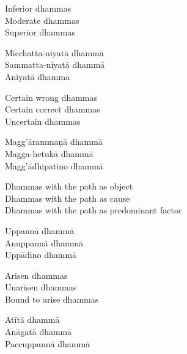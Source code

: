 \begin{english-verses}
  Inferior dhammas\\
  Moderate dhammas\\
  Superior dhammas
\end{english-verses}

\begin{pali-hang-continued}
  Micchatta-niyatā dhammā\\
  Sammatta-niyatā dhammā\\
  Aniyatā dhammā
\end{pali-hang-continued}

\begin{english-verses}
  Certain wrong dhammas\\
  Certain correct dhammas\\
  Uncertain dhammas
\end{english-verses}

\ifbfive\clearpage\fi

\begin{pali-hang-continued}
  Magg'ārammaṇā dhammā\\
  Magga-hetukā dhammā\\
  Magg'ādhipatino dhammā
\end{pali-hang-continued}

\ifafive\clearpage\fi

\begin{english-verses}
  Dhammas with the path as object\\
  Dhammas with the path as cause\\
  Dhammas with the path as predominant factor
\end{english-verses}

\begin{pali-hang-continued}
  Uppannā dhammā\\
  Anuppannā dhammā\\
  Uppādino dhammā
\end{pali-hang-continued}

\begin{english-verses}
  Arisen dhammas\\
  Unarisen dhammas\\
  Bound to arise dhammas
\end{english-verses}

\begin{pali-hang-continued}
  Atītā dhammā\\
  Anāgatā dhammā\\
  Paccuppannā dhammā
\end{pali-hang-continued}

